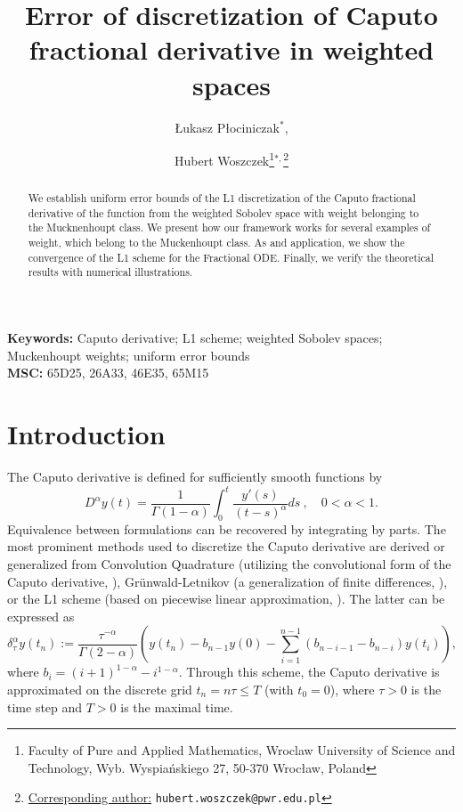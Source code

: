 \documentclass[12pt,a4paper]{article}
\title{Error of discretization of Caputo fractional derivative in weighted spaces}
\author{
\L{}ukasz P\l{}ociniczak$^*$, \and Hubert Woszczek\thanks{Faculty of Pure and Applied Mathematics, Wroclaw University of Science and Technology, Wyb. Wyspia\'nskiego 27, 50-370 Wroc{\l}aw, Poland}$^{*,}$\thanks{\underline{Corresponding author:} \texttt{hubert.woszczek@pwr.edu.pl}}
}
\date{}
\theoremstyle{definition}
\begin{document}
\maketitle

\begin{abstract}
	We establish uniform error bounds of the L1 discretization of the Caputo fractional derivative of the function from the weighted Sobolev space with weight belonging to the Mucknenhoupt class. We present how our framework works for several examples of weight, which belong to the Muckenhoupt class. As and application, we show the convergence of the L1 scheme for the Fractional ODE. Finally, we verify the theoretical results with numerical illustrations.
\end{abstract}

\textbf{Keywords: }Caputo derivative; L1 scheme; weighted Sobolev spaces; Muckenhoupt weights; uniform error bounds \\ 

\textbf{MSC: }65D25, 26A33, 46E35, 65M15

\section{Introduction}
The Caputo derivative is defined for sufficiently smooth functions by
\begin{equation}\label{eq:1.1}
D^\alpha y(t) = \frac{1}{\Gamma(1-\alpha)} \int_0^t \frac{y'(s)}{(t-s)^\alpha} ds \ , \quad 0 < \alpha < 1.
\end{equation}
Equivalence between formulations can be recovered by integrating by parts. The most prominent methods used to discretize the Caputo derivative are derived or generalized from Convolution Quadrature (utilizing the convolutional form of the Caputo derivative, \cite{Lubich2004}), Gr\"{u}nwald-Letnikov (a generalization of finite differences, \cite{Gorenflo2007}), or the L1 scheme (based on piecewise linear approximation, \cite{Stynes2022}). The latter can be expressed as
\begin{equation} \label{eq:1.2}
    \delta_\tau^\alpha y(t_n) := \frac{\tau^{-\alpha}}{\Gamma(2-\alpha)} \left( y(t_n) - b_{n-1}y(0) - \sum_{i=1}^{n-1} (b_{n-i-1} - b_{n-i})y(t_i) \right),
\end{equation}
where $b_i = (i+1)^{1-\alpha} - i^{1-\alpha}$. Through this scheme, the Caputo derivative is approximated on the discrete grid $t_n = n\tau \leq T$ (with $t_0 = 0$), where $\tau > 0$ is the time step and $T > 0$ is the maximal time. 
\end{document}
